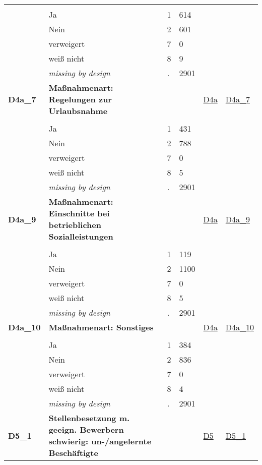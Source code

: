\begin{longtable}{| L{2.45cm} | L{6cm} | C{1.5cm} | R{1cm} | C{2.25cm} | C{2.25cm} |}
   &  &  &  &  &  \\ 
   & Ja & 1 & 614 &  &  \\ 
   & Nein & 2 & 601 &  &  \\ 
   & verweigert & 7 & 0 &  &  \\ 
   & weiß nicht & 8 & 9 &  &  \\ 
   & \textit{missing by design} & \textit{.} & 2901 &  &  \\ 
   \midrule
\textbf{D4a\_7}\label{var:D4a:7} & \textbf{Maßnahmenart: Regelungen zur Urlaubsnahme} &  &  & \hyperref[D4a]{D4a} & \hyperref[var:suf:D4a:7]{D4a\_7} \\ 
   &  &  &  &  &  \\ 
   & Ja & 1 & 431 &  &  \\ 
   & Nein & 2 & 788 &  &  \\ 
   & verweigert & 7 & 0 &  &  \\ 
   & weiß nicht & 8 & 5 &  &  \\ 
   & \textit{missing by design} & \textit{.} & 2901 &  &  \\ 
   \midrule
\textbf{D4a\_9}\label{var:D4a:9} & \textbf{Maßnahmenart: Einschnitte bei betrieblichen Sozialleistungen} &  &  & \hyperref[D4a]{D4a} & \hyperref[var:suf:D4a:9]{D4a\_9} \\ 
   &  &  &  &  &  \\ 
   & Ja & 1 & 119 &  &  \\ 
   & Nein & 2 & 1100 &  &  \\ 
   & verweigert & 7 & 0 &  &  \\ 
   & weiß nicht & 8 & 5 &  &  \\ 
   & \textit{missing by design} & \textit{.} & 2901 &  &  \\ 
   \midrule
\textbf{D4a\_10}\label{var:D4a:10} & \textbf{Maßnahmenart: Sonstiges} &  &  & \hyperref[D4a]{D4a} & \hyperref[var:suf:D4a:10]{D4a\_10} \\ 
   &  &  &  &  &  \\ 
   & Ja & 1 & 384 &  &  \\ 
   & Nein & 2 & 836 &  &  \\ 
   & verweigert & 7 & 0 &  &  \\ 
   & weiß nicht & 8 & 4 &  &  \\ 
   & \textit{missing by design} & \textit{.} & 2901 &  &  \\ 
   \midrule
\textbf{D5\_1}\label{var:D5:1} & \textbf{Stellenbesetzung m. geeign. Bewerbern schwierig: un-/angelernte Beschäftigte} &  &  & \hyperref[D5]{D5} & \hyperref[var:suf:D5:1]{D5\_1} \\ 

\end{longtable}
